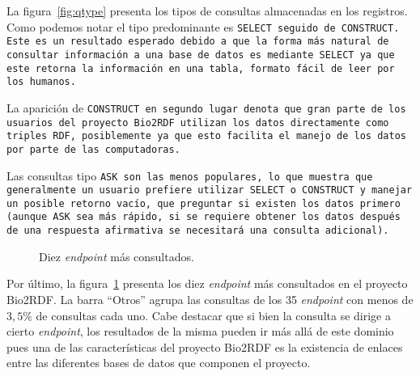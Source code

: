 La figura~\ref{fig:qtype} presenta los tipos de consultas almacenadas en los
registros. Como podemos notar el tipo predominante es \tt{SELECT} seguido de
\tt{CONSTRUCT}. Este es un resultado esperado debido a que la forma más natural
de consultar información a una base de datos es mediante \tt{SELECT} ya que este
retorna la información en una tabla, formato fácil de leer por los humanos.

La aparición de \tt{CONSTRUCT} en segundo lugar denota que gran parte de los
usuarios del proyecto Bio2RDF utilizan los datos directamente como  triples RDF,
posiblemente ya que esto facilita el manejo de los datos por parte de las
computadoras.

Las consultas tipo \tt{ASK} son las menos populares, lo que muestra que
generalmente un usuario prefiere utilizar \tt{SELECT} o \tt{CONSTRUCT} y manejar
un posible retorno vacío, que preguntar si existen los datos primero (aunque
\tt{ASK} sea más rápido, si se requiere obtener los datos después de una
respuesta afirmativa se necesitará una consulta adicional).

\begin{figure}[ht]
  \caption{Diez \emph{endpoint} más consultados.}\label{fig:t10endp}
\end{figure}

Por último, la figura~\ref{fig:t10endp} presenta los diez \emph{endpoint} más
consultados en el proyecto Bio2RDF. La barra ``Otros'' agrupa las consultas de
los 35 \emph{endpoint} con menos de $3,5\%$ de consultas cada uno. Cabe destacar
que si bien la consulta se dirige a cierto \emph{endpoint}, los resultados de la
misma pueden ir más allá de este dominio pues una de las características del
proyecto Bio2RDF es la existencia de enlaces entre las diferentes bases de datos
que componen el proyecto.

